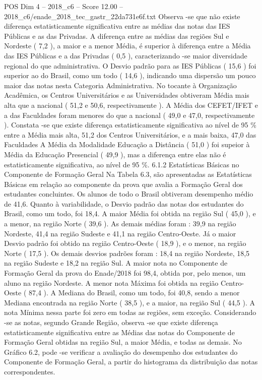 \begin{textsample}{POS Dim 4 – 2018\_c6 – Score 12.00 – 2018\_c6/enade\_2018\_tec\_gastr\_22da731e6f.txt}
Observa -se que não existe diferença estatisticamente significativa entre as médias das notas das IES Públicas e as das Privadas.
A diferença entre as médias das regiões Sul e Nordeste ( 7,2 ), a maior e a menor Média, é superior à diferença entre a Média das IES Públicas e a das Privadas ( 0,5 ), caracterizando -se maior diversidade regional do que administrativa.
O Desvio padrão para as IES Públicas ( 15,6 ) foi superior ao do Brasil, como um todo ( 14,6 ), indicando uma dispersão um pouco maior das notas nesta Categoria Administrativa.
No tocante à Organização Acadêmica, os Centros Universitários e as Universidades obtiveram Média mais alta que a nacional ( 51,2 e 50,6, respectivamente ).
A Média dos CEFET/IFET e a das Faculdades foram menores do que a nacional ( 49,0 e 47,0, respectivamente ).
Constata -se que existe diferença estatisticamente significativa ao nível de 95 \% entre a Média mais alta, 51,2 dos Centros Universitários, e a mais baixa, 47,0 das Faculdades A Média da Modalidade Educação a Distância ( 51,0 ) foi supeior à Média da Educação Presencial ( 49,9 ), mas a diferença entre elas não é estatisticamente significativa, ao nível de 95 \%. 6.1.2 Estatísticas Básicas no Componente de Formação Geral Na Tabela 6.3, são apresentadas as Estatísticas Básicas em relação ao componente da prova que avalia a Formação Geral dos estudantes concluintes.
Os alunos de todo o Brasil obtiveram desempenho médio de 41,6.
Quanto à variabilidade, o Desvio padrão das notas dos estudantes do Brasil, como um todo, foi 18,4.
A maior Média foi obtida na região Sul ( 45,0 ), e a menor, na região Norte ( 39,6 ).
As demais médias foram : 39,9 na região Nordeste, 41,4 na região Sudeste e 41,1 na região Centro-Oeste.
Já o maior Desvio padrão foi obtido na região Centro-Oeste ( 18,9 ), e o menor, na região Norte ( 17,5 ).
Os demais desvios padrões foram : 18,4 na região Nordeste, 18,5 na região Sudeste e 18,2 na região Sul.
A maior nota no Componente de Formação Geral da prova do Enade/2018 foi 98,4, obtida por, pelo menos, um aluno na região Nordeste.
A menor nota Máxima foi obtida na região Centro-Oeste ( 87,4 ).
A Mediana do Brasil, como um todo, foi 40,8, sendo a menor Mediana encontrada na região Norte ( 38,5 ), e a maior, na região Sul ( 44,5 ).
A nota Mínima nessa parte foi zero em todas as regiões, sem exceção.
Considerando -se as notas, segundo Grande Região, observa -se que existe diferença estatisticamente significativa entre as Médias das notas do Componente de Formação Geral obtidas na região Sul, a maior Média, e todas as demais.
No Gráfico 6.2, pode -se verificar a avaliação do desempenho dos estudantes do Componente de Formação Geral, a partir do histograma da distribuição das notas correspondentes.

\end{textsample}
